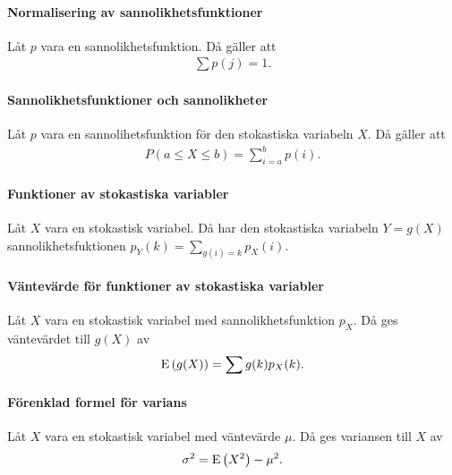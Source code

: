 \paragraph{Normalisering av sannolikhetsfunktioner}
Låt $p$ vara en sannolikhetsfunktion. Då gäller att
\begin{align*}
	\sum p(j) = 1.
\end{align*}

\proof

\paragraph{Sannolikhetsfunktioner och sannolikheter}
Låt $p$ vara en sannolihetsfunktion för den stokastiska variabeln $X$. Då gäller att
\begin{align*}
	P(a\leq X\leq b) = \sum\limits_{i = a}^{b}p(i).
\end{align*}

\proof

\paragraph{Funktioner av stokastiska variabler}
Låt $X$ vara en stokastisk variabel. Då har den stokastiska variabeln $Y = g(X)$ sannolikhetsfuktionen $p_{Y}(k) = \sum\limits_{g(i) = k}p_{X}(i)$.

\proof

\paragraph{Väntevärde för funktioner av stokastiska variabler}
Låt $X$ vara en stokastisk variabel med sannolikhetsfunktion $p_{X}$. Då ges väntevärdet till $g(X)$ av
\begin{align*}
	\text{E}\left(g(X)\right) = \sum g(k)p_{X}(k).
\end{align*}

\proof

\paragraph{Förenklad formel för varians}
Låt $X$ vara en stokastisk variabel med väntevärde $\mu$. Då ges variansen till $X$ av
\begin{align*}
	\sigma^2 = \text{E}\left(X^2\right) - \mu^2.
\end{align*}

\proof